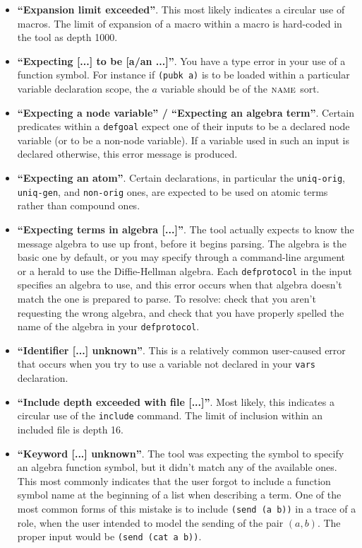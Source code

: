 \begin{itemize}
\item \textbf{``Expansion limit exceeded''}.  This most likely indicates
  a circular use of macros.  The limit of expansion of a macro within a macro is
  hard-coded in the tool as depth 1000.

\item \textbf{``Expecting [...] to be [a/an ...]''}.  You have a type
  error in your use of a function symbol.  For instance if
  \texttt{(pubk a)} is to be loaded within a particular variable
  declaration scope, the $a$ variable should be of the $\scap{name}$
  sort.

\item \textbf{``Expecting a node variable'' / ``Expecting an algebra
  term''}.  Certain predicates within a \texttt{defgoal} expect one of
  their inputs to be a declared node variable (or to be a non-node
  variable).  If a variable used in such an input is declared
  otherwise, this error message is produced.

\item \textbf{``Expecting an atom''}.  Certain declarations, in particular
  the \texttt{uniq-orig}, \texttt{uniq-gen}, and \texttt{non-orig} ones,
  are expected to be used on atomic terms rather than compound ones.

\item \textbf{``Expecting terms in algebra [...]''}.  The tool
  actually expects to know the message algebra to use up front, before
  it begins parsing.  The algebra is the basic one by default, or you
  may specify through a command-line argument or a herald to use the
  Diffie-Hellman algebra.  Each \texttt{defprotocol} in the input
  specifies an algebra to use, and this error occurs when that algebra
  doesn't match the one {\cpsa} is prepared to parse.  To resolve:
  check that you aren't requesting the wrong algebra, and check that
  you have properly spelled the name of the algebra in your
  \texttt{defprotocol}.

\item \textbf{``Identifier [...] unknown''}.  This is a relatively common
  user-caused error that occurs when you try to use a variable not declared
  in your \texttt{vars} declaration.

\item \textbf{``Include depth exceeded with file [...]''}.  Most
  likely, this indicates a circular use of the \texttt{include}
  command.  The limit of inclusion within an included file is depth
  16.

\item \textbf{``Keyword [...] unknown''}.  The tool was expecting the symbol
  to specify an algebra function symbol, but it didn't match any of the available
  ones.  This most commonly indicates that the user forgot to include a
  function symbol name at the beginning of a list when describing a term.  One of
  the most common forms of this mistake is to include \texttt{(send (a b))} in
  a trace of a role, when the user intended to model the sending of the pair $(a,b)$.
  The proper input would be \texttt{(send (cat a b))}.


\end{itemize}
